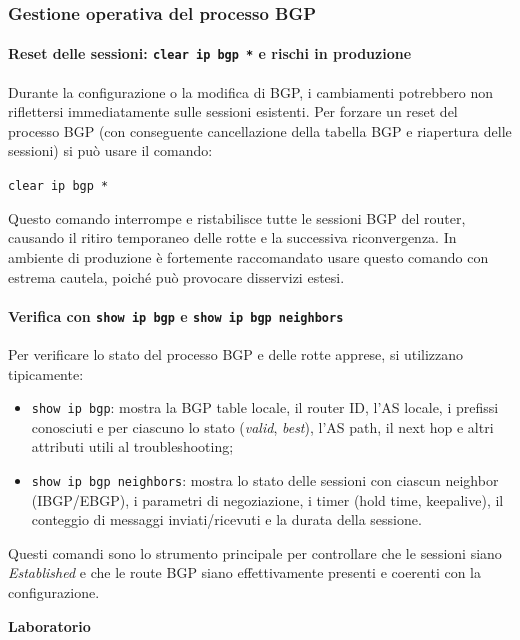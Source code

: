 \subsubsection{Gestione operativa del processo BGP}

\paragraph{Reset delle sessioni: \texttt{clear ip bgp *} e rischi in produzione}

Durante la configurazione o la modifica di BGP, i cambiamenti potrebbero non riflettersi immediatamente sulle sessioni esistenti. Per forzare un reset del processo BGP (con conseguente cancellazione della tabella BGP e riapertura delle sessioni) si può usare il comando:
\begin{center}
    \texttt{clear ip bgp *}
\end{center}
Questo comando interrompe e ristabilisce tutte le sessioni BGP del router, causando il ritiro temporaneo delle rotte e la successiva riconvergenza. In ambiente di produzione è fortemente raccomandato usare questo comando con estrema cautela, poiché può provocare disservizi estesi.

\paragraph{Verifica con \texttt{show ip bgp} e \texttt{show ip bgp neighbors}}

Per verificare lo stato del processo BGP e delle rotte apprese, si utilizzano tipicamente:
\begin{itemize}
    \item \texttt{show ip bgp}: mostra la BGP table locale, il router ID, l’AS locale, i prefissi conosciuti e per ciascuno lo stato (\emph{valid}, \emph{best}), l’AS path, il next hop e altri attributi utili al troubleshooting;
    \item \texttt{show ip bgp neighbors}: mostra lo stato delle sessioni con ciascun neighbor (IBGP/EBGP), i parametri di negoziazione, i timer (hold time, keepalive), il conteggio di messaggi inviati/ricevuti e la durata della sessione.
\end{itemize}
Questi comandi sono lo strumento principale per controllare che le sessioni siano \emph{Established} e che le route BGP siano effettivamente presenti e coerenti con la configurazione.

\newpage
\maketitle
{\LARGE \textbf{Laboratorio}} \\[0.5em]
